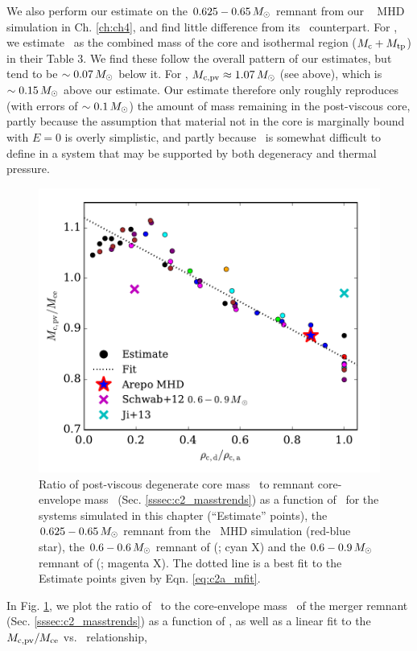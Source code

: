 \noindent  We also perform our estimate on the $0.625 - 0.65\,\Msun$ remnant from our \arepo\ \citep{spri10} MHD simulation in Ch. \ref{ch:ch4}, and find little difference from its \gasoline\ counterpart.  For \cite{schw+12}, we estimate \Mcpv\ as the combined mass of the core and isothermal region ($M_\mathrm{c} + M_\mathrm{tp}$) in their Table 3.  We find these follow the overall pattern of our estimates, but tend to be $\sim0.07\,\Msun$ below it.  For \cite{ji+13}, $\Mcpv \approx 1.07\,\Msun$ (see above), which is $\sim0.15\,\Msun$ above our estimate.  Our estimate therefore only roughly reproduces (with errors of $\sim0.1\,\Msun$) the amount of mass remaining in the post-viscous core, partly because the assumption that material not in the core is marginally bound with $E = 0$ is overly simplistic, and partly because \Mcpv\ is somewhat difficult to define in a system that may be supported by both degeneracy and thermal pressure.

\begin{figure}
\centering
\includegraphics[angle=0,width=0.6\columnwidth]{chapter2_zhu+13/figures/c2a_McMce_vs_qrho.pdf}
\caption{Ratio of post-viscous degenerate core mass \Mcpv\ to remnant core-envelope mass \Mce\ (Sec. \ref{sssec:c2_masstrends}) as a function of \qrho\ for the systems simulated in this chapter (``Estimate'' points), the $0.625 - 0.65\,\Msun$ remnant from the \arepo\ MHD simulation (red-blue star), the $0.6 - 0.6\,\Msun$ remnant of \citeauthor{ji+13} (\citeyear{ji+13}; cyan X) and the $0.6 - 0.9\,\Msun$ remnant of \citeauthor{schw+12} (\citeyear{schw+12}; magenta X).  The dotted line is a best fit to the Estimate points given by Eqn. \ref{eq:c2a_mfit}.}
\label{fig:c2a_mcmce_qrho}
\end{figure}

In Fig. \ref{fig:c2a_mcmce_qrho}, we plot the ratio of \Mcpv\ to the core-envelope mass \Mce\ of the merger remnant (Sec. \ref{sssec:c2_masstrends}) as a function of \qrho, as well as a linear fit to the $\Mcpv/\Mce$ vs. \qrho\ relationship, 

